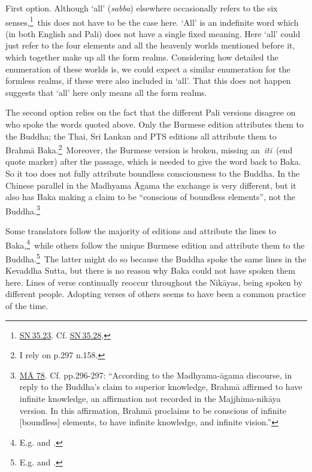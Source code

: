 \documentclass[10pt, openright]{book}
\begin{document}
First option. Although ‘all’ (\textit{sabba}) elsewhere occasionally refers to the six senses,\footnote {\href{https://suttacentral.net/sn35.23/en/sujato}{SN 35.23}. Cf. \href{https://suttacentral.net/sn35.28/en/sujato}{SN 35.28}.} this does not have to be the case here. ‘All’ is an indefinite word which (in both English and Pali) does not have a single fixed meaning. Here ‘all’ could just refer to the four elements and all the heavenly worlds mentioned before it, which together make up all the form realms. Considering how detailed the enumeration of these worlds is, we could expect a similar enumeration for the formless realms, if these were also included in ‘all’. That this does not happen suggests that ‘all’ here only means all the form realms.


The second option relies on the fact that the different Pali versions disagree on who spoke the words quoted above. Only the Burmese edition attributes them to the Buddha; the Thai, Sri Lankan and PTS editions all attribute them to Brahmā Baka.\footnote {I rely on \cite{Anālayo 2010} p.297 n.158.} Moreover, the Burmese version is broken, missing an \textit{iti} (end quote marker) after the passage, which is needed to give the word back to Baka. So it too does not fully attribute boundless consciousness to the Buddha. In the Chinese parallel in the Madhyama Āgama the exchange is very different, but it also has Baka making a claim to be “conscious of boundless elements”, not the Buddha.\footnote {\href{https://suttacentral.net/ma78}{MĀ 78}. Cf. \cite{Anālayo 2010} pp.296-297: “According to the Madhyama-āgama discourse, in reply to the Buddha's claim to superior knowledge, Brahmā affirmed to have infinite knowledge, an affirmation not recorded in the Majjhima-nikāya version. In this affirmation, Brahmā proclaims to be conscious of infinite [boundless] elements, to have infinite knowledge, and infinite vision.”}


Some translators follow the majority of editions and attribute the lines to Baka,\footnote {E.g. \cite{Horner} and \cite{Sujato 2018}.} while others follow the unique Burmese edition and attribute them to the Buddha.\footnote {E.g. \cite{Ñāṇamoli} and \cite{Ṭhānissaro}.} The latter might do so because the Buddha spoke the same lines in the Kevaddha Sutta, but there is no reason why Baka could not have spoken them here. Lines of verse continually reoccur throughout the Nikāyas, being spoken by different people. Adopting verses of others seems to have been a common practice of the time.
\end{document}
